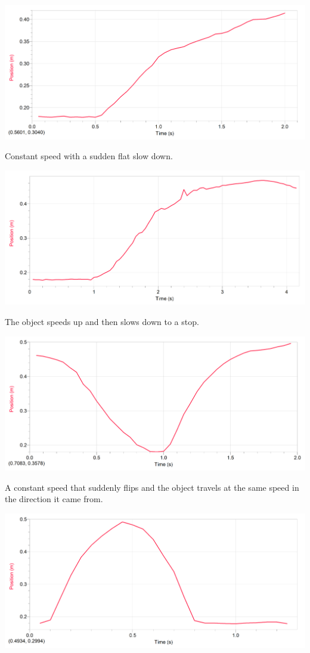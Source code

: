     \begin{center}
        \includegraphics[width=\textwidth]{image9.png}

        Constant speed with a sudden flat slow down.

        \includegraphics[width=\textwidth]{image10.png}
        
        The object speeds up and then slows down to a stop.

        \includegraphics[width=\textwidth]{image1.png}
        
        A constant speed that suddenly flips and the object travels at the same speed in the direction it came from.

        \includegraphics[width=\textwidth]{image8.png}
        

\end{center}
